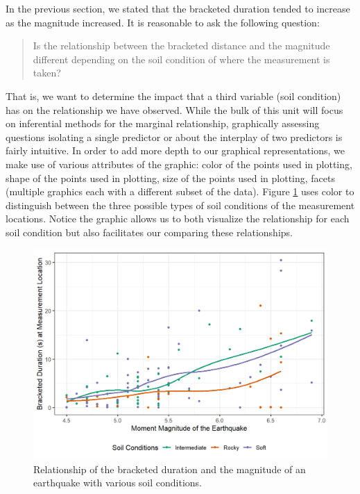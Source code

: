 \documentclass[
]{book}
\theoremstyle{plain}
\theoremstyle{mydefn}
\theoremstyle{myexmpl}
\theoremstyle{remark}
\begin{document}
In the previous section, we stated that the bracketed duration tended to increase as the magnitude increased. It is reasonable to ask the following question:

\begin{quote}
Is the relationship between the bracketed distance and the magnitude different depending on the soil condition of where the measurement is taken?
\end{quote}

That is, we want to determine the impact that a third variable (soil condition) has on the relationship we have observed. While the bulk of this unit will focus on inferential methods for the marginal relationship, graphically assessing questions isolating a single predictor or about the interplay of two predictors is fairly intuitive. In order to add more depth to our graphical representations, we make use of various attributes of the graphic: color of the points used in plotting, shape of the points used in plotting, size of the points used in plotting, facets (multiple graphics each with a different subset of the data). Figure \ref{fig:regsummaries-color} uses color to distinguish between the three possible types of soil conditions of the measurement locations. Notice the graphic allows us to both visualize the relationship for each soil condition but also facilitates our comparing these relationships.

\begin{figure}

{\centering \includegraphics[width=0.8\linewidth]{./Images/regsummaries-color-1} 

}

\caption{Relationship of the bracketed duration and the magnitude of an earthquake with various soil conditions.}\label{fig:regsummaries-color}
\end{figure}
\end{document}
